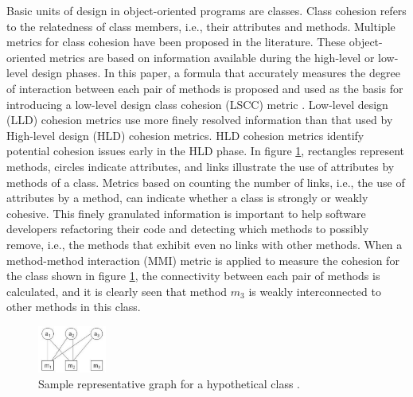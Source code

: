 Basic units of design in object-oriented programs are classes. Class cohesion refers to the relatedness of class members, i.e., their attributes and methods. Multiple metrics for class cohesion have been proposed in the literature. These object-oriented metrics are based on information available during the high-level or low-level design phases.
In this paper, a formula that accurately measures the degree of interaction between each pair of methods is proposed and used as the basis for introducing a low-level design class cohesion (LSCC) metric \cite{b8al2012precise}. Low-level design (LLD) cohesion metrics use more finely resolved information than that used by High-level design (HLD) cohesion metrics. HLD cohesion metrics identify potential cohesion issues early in the HLD phase. 
In figure \ref{fig1}, rectangles represent methods, circles indicate attributes, and links illustrate the use of attributes by methods of a class. Metrics based on counting the number of links, i.e., the use of attributes by a method, can indicate whether a class is strongly or weakly cohesive. This finely granulated
information is important to help software developers refactoring their code and detecting which methods to possibly remove, i.e., the methods that exhibit even no
links with other methods. When a method-method interaction (MMI) metric
is applied to measure the cohesion for the class shown in figure \ref{fig1}, the
connectivity between each pair of methods is calculated, and it is clearly seen that
method $m_3$ is weakly interconnected to other methods in this class.

\begin{figure}[htbp]
	\centerline{\includegraphics[width=0.2\textwidth]{pictures/am.png}}
	\caption{Sample representative graph for a hypothetical class \cite{b3al2012fault}.}
	\label{fig1}
\end{figure}

